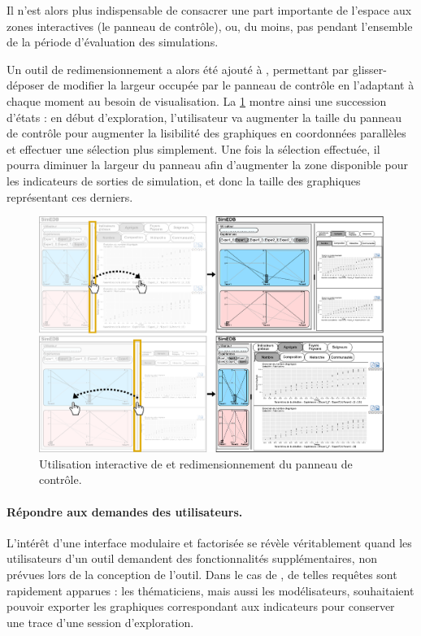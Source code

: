 Il n'est alors plus indispensable de consacrer une part importante de l'espace aux zones interactives (le panneau de contrôle), ou, du moins, pas pendant l'ensemble de la période d'évaluation des simulations.

Un outil de redimensionnement a alors été ajouté à \simedb{}, permettant par glisser-déposer de modifier la largeur occupée par le panneau de contrôle en l'adaptant à chaque moment au besoin de visualisation.
La \cref{fig:resizing} montre ainsi une succession d'états : en début d'exploration, l'utilisateur va augmenter la taille du panneau de contrôle pour augmenter la lisibilité des graphiques en coordonnées parallèles et effectuer une sélection plus simplement.
Une fois la sélection effectuée, il pourra diminuer la largeur du panneau afin d'augmenter la zone disponible pour les indicateurs de sorties de simulation, et donc la taille des graphiques représentant ces derniers. 

\begin{figure}[H]
	\centering
	\includegraphics[width=\linewidth]{img/mockup_SimEDB_resize.pdf}
	\caption{Utilisation interactive de \simedb{} et redimensionnement du panneau de contrôle.}
	\label{fig:resizing}
\end{figure}

\paragraph{Répondre aux demandes des utilisateurs.}

L'intérêt d'une interface modulaire et factorisée se révèle véritablement quand les utilisateurs d'un outil demandent des fonctionnalités supplémentaires, non prévues lors de la conception de l'outil.
Dans le cas de \simfeodal{}, de telles requêtes sont rapidement apparues : les thématiciens, mais aussi les modélisateurs, souhaitaient pouvoir exporter les graphiques correspondant aux indicateurs pour conserver une trace d'une session d'exploration.

